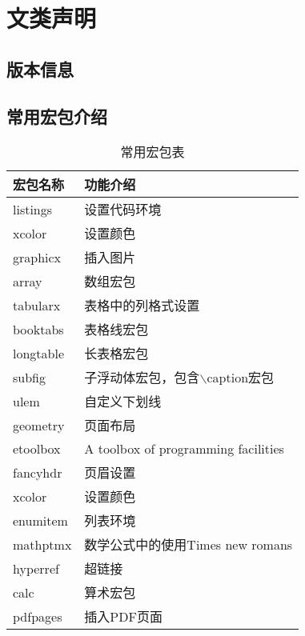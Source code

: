 \chapter{文类声明}
\section{版本信息}


\section{常用宏包介绍}
\begin{table}[!ht]
  \centering
  \caption{常用宏包表\label{tab:4-1}}
  \begin{tabular}{@{\makebox[1em][l]{}}ll@{\makebox[1em][l]{}}}
    \toprule[1pt]
    宏包名称 & 功能介绍 \\ 
    \midrule
    listings   & 设置代码环境                        \\
    xcolor     & 设置颜色                            \\
    graphicx   & 插入图片                            \\
    array      & 数组宏包                            \\
    tabularx   & 表格中的列格式设置                  \\
    booktabs   & 表格线宏包                          \\
    longtable  & 长表格宏包                          \\
    subfig     & 子浮动体宏包，包含$\backslash$caption宏包    \\
    ulem       & 自定义下划线                        \\
    geometry   & 页面布局                            \\
    etoolbox   & A toolbox of programming facilities \\
    fancyhdr   & 页眉设置                            \\
    xcolor     & 设置颜色                            \\
    enumitem   & 列表环境                            \\
    mathptmx   & 数学公式中的使用Times new romans    \\
    hyperref   & 超链接                              \\
    calc       & 算术宏包                            \\
    pdfpages   & 插入PDF页面                         \\
    \bottomrule[1pt]
  \end{tabular}
\end{table}



